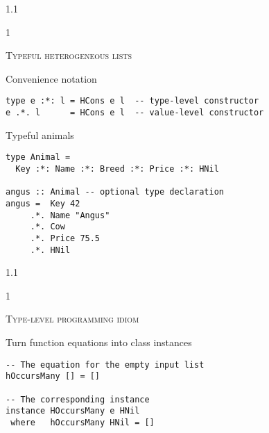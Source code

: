 \documentclass{slides}
\newcommand{\header}[1]{{\large\scshape \color{Red} #1} \medskip }
\newcommand{\blau}[1]{{\color{Blue} #1} \medskip }
\newenvironment{myslide}{\begin{slide}\color{Blue}\begin{boxedminipage}{1.1\hsize}\begin{boxedminipage}{1\hsize}\color{Black}
\vspace{-170\in}
}{%
\smallskip
\end{boxedminipage}
\end{boxedminipage}
\end{slide}}
\begin{document}
\begin{myslide}

\header{Typeful heterogeneous lists}

\blau{Convenience notation}

\begin{Verbatim}[fontseries=normal,fontsize=\tiny]
type e :*: l = HCons e l  -- type-level constructor
e .*. l      = HCons e l  -- value-level constructor
\end{Verbatim}

\medskip

\blau{Typeful animals}

\begin{Verbatim}[fontseries=normal,fontsize=\tiny]
type Animal =
  Key :*: Name :*: Breed :*: Price :*: HNil

angus :: Animal -- optional type declaration
angus =  Key 42
     .*. Name "Angus"
     .*. Cow
     .*. Price 75.5
     .*. HNil
\end{Verbatim}

\end{myslide}






\begin{myslide}

\header{Type-level programming idiom}

\blau{Turn function equations into class instances}

\bigskip

\begin{Verbatim}[fontseries=normal,fontsize=\tiny]
-- The equation for the empty input list
hOccursMany [] = []

-- The corresponding instance
instance HOccursMany e HNil
 where   hOccursMany HNil = []
\end{Verbatim}

\end{myslide}



\end{document}
